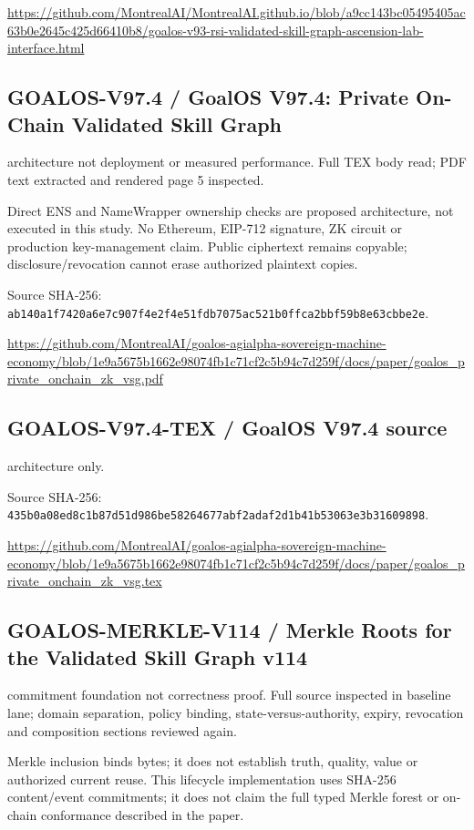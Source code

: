 \documentclass[10pt]{article}
\begin{document}
\url{https://github.com/MontrealAI/MontrealAI.github.io/blob/a9cc143bc05495405ac63b0e2645c425d66410b8/goalos-v93-rsi-validated-skill-graph-ascension-lab-interface.html}

\subsection*{GOALOS-V97.4 / GoalOS V97.4: Private On-Chain Validated Skill Graph}

architecture not deployment or measured performance. Full TEX body read; PDF text extracted and rendered page 5 inspected.

Direct ENS and NameWrapper ownership checks are proposed architecture, not executed in this study. No Ethereum, EIP-712 signature, ZK circuit or production key-management claim. Public ciphertext remains copyable; disclosure/revocation cannot erase authorized plaintext copies.

Source SHA-256: \nolinkurl{ab140a1f7420a6e7c907f4e2f4e51fdb7075ac521b0ffca2bbf59b8e63cbbe2e}.

\url{https://github.com/MontrealAI/goalos-agialpha-sovereign-machine-economy/blob/1e9a5675b1662e98074fb1c71cf2c5b94c7d259f/docs/paper/goalos_private_onchain_zk_vsg.pdf}

\subsection*{GOALOS-V97.4-TEX / GoalOS V97.4 source}

architecture only. 



Source SHA-256: \nolinkurl{435b0a08ed8c1b87d51d986be58264677abf2adaf2d1b41b53063e3b31609898}.

\url{https://github.com/MontrealAI/goalos-agialpha-sovereign-machine-economy/blob/1e9a5675b1662e98074fb1c71cf2c5b94c7d259f/docs/paper/goalos_private_onchain_zk_vsg.tex}

\subsection*{GOALOS-MERKLE-V114 / Merkle Roots for the Validated Skill Graph v114}

commitment foundation not correctness proof. Full source inspected in baseline lane; domain separation, policy binding, state-versus-authority, expiry, revocation and composition sections reviewed again.

Merkle inclusion binds bytes; it does not establish truth, quality, value or authorized current reuse. This lifecycle implementation uses SHA-256 content/event commitments; it does not claim the full typed Merkle forest or on-chain conformance described in the paper.
\end{document}
